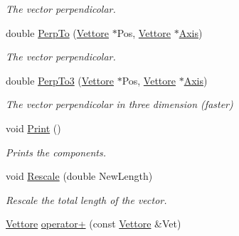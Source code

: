 \begin{DoxyCompactItemize}
\begin{DoxyCompactList}\small\item\em \-The vector perpendicolar. \end{DoxyCompactList}\item 
\hypertarget{classVettore_ab1ccf9725311b3fdb06d382bbdfc1066}{double \hyperlink{classVettore_ab1ccf9725311b3fdb06d382bbdfc1066}{\-Perp\-To} (\hyperlink{classVettore}{\-Vettore} $\ast$\-Pos, \hyperlink{classVettore}{\-Vettore} $\ast$\hyperlink{classVettore_a5a767accac3ff301f062fce739190bb8}{\-Axis})}\label{classVettore_ab1ccf9725311b3fdb06d382bbdfc1066}

\begin{DoxyCompactList}\small\item\em \-The vector perpendicolar. \end{DoxyCompactList}\item 
\hypertarget{classVettore_a0d1417eacc715d326e65e21a7c6d50ec}{double \hyperlink{classVettore_a0d1417eacc715d326e65e21a7c6d50ec}{\-Perp\-To3} (\hyperlink{classVettore}{\-Vettore} $\ast$\-Pos, \hyperlink{classVettore}{\-Vettore} $\ast$\hyperlink{classVettore_a5a767accac3ff301f062fce739190bb8}{\-Axis})}\label{classVettore_a0d1417eacc715d326e65e21a7c6d50ec}

\begin{DoxyCompactList}\small\item\em \-The vector perpendicolar in three dimension (faster) \end{DoxyCompactList}\item 
\hypertarget{classVettore_a9dcac18006ce057b8d78c847174c1362}{void \hyperlink{classVettore_a9dcac18006ce057b8d78c847174c1362}{\-Print} ()}\label{classVettore_a9dcac18006ce057b8d78c847174c1362}

\begin{DoxyCompactList}\small\item\em \-Prints the components. \end{DoxyCompactList}\item 
\hypertarget{classVettore_a735ba6810472f29b5158d6f266371c9b}{void \hyperlink{classVettore_a735ba6810472f29b5158d6f266371c9b}{\-Rescale} (double \-New\-Length)}\label{classVettore_a735ba6810472f29b5158d6f266371c9b}

\begin{DoxyCompactList}\small\item\em \-Rescale the total length of the vector. \end{DoxyCompactList}\item 
\hypertarget{classVettore_aa47e7ac4476114c127060e8ab4b0bd1c}{\hyperlink{classVettore}{\-Vettore} \hyperlink{classVettore_aa47e7ac4476114c127060e8ab4b0bd1c}{operator+} (const \hyperlink{classVettore}{\-Vettore} \&\-Vet)}\label{classVettore_aa47e7ac4476114c127060e8ab4b0bd1c}


\end{DoxyCompactItemize}
